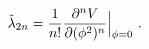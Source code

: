 \begin{equation}
\tilde\lambda_{2n}=
{1\over n!}{\partial^n V\over\partial (\phi^2)^n}\Big|_{\phi=0}\ .
\end{equation}

